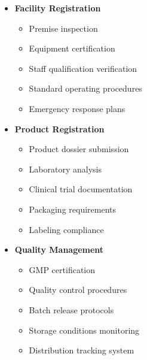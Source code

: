 \begin{tcolorbox}[
    colback=white,
    colframe=primarydark,
    title=\textbf{NAFDAC and Medical Requirements},
    before skip=1em,
    after skip=1em
]
    \begin{itemize}[leftmargin=*,itemsep=0.5em]
        \item \textbf{Facility Registration}
        \begin{itemize}[itemsep=0.3em]
            \item Premise inspection
            \item Equipment certification
            \item Staff qualification verification
            \item Standard operating procedures
            \item Emergency response plans
        \end{itemize}

        \vspace{0.5em}

        \item \textbf{Product Registration}
        \begin{itemize}[itemsep=0.3em]
            \item Product dossier submission
            \item Laboratory analysis
            \item Clinical trial documentation
            \item Packaging requirements
            \item Labeling compliance
        \end{itemize}

        \vspace{0.5em}

        \item \textbf{Quality Management}
        \begin{itemize}[itemsep=0.3em]
            \item GMP certification
            \item Quality control procedures
            \item Batch release protocols
            \item Storage conditions monitoring
            \item Distribution tracking system
        \end{itemize}

        \vspace{0.5em}


\end{itemize}
\end{tcolorbox}
